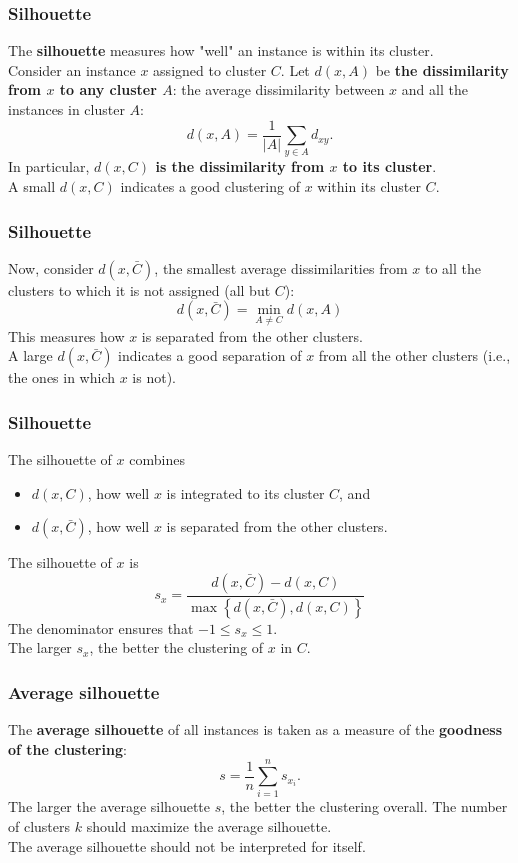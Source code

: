 \begin{frame}
\frametitle{Silhouette}
The {\bf silhouette} measures how "well" an instance is within its cluster. \\
\vspace{0.3cm}
Consider an instance $x$ assigned to cluster $C$. Let $d(x,A)$ be {\bf the dissimilarity from $x$ to any cluster $A$}: the average dissimilarity between $x$ and all the instances in cluster $A$:
$$
d(x,A) = \frac{1}{|A|} \sum_{y\in A} d_{xy}.
$$ 
In particular, {\bf $d(x, C)$ is the dissimilarity from $x$ to its cluster}.\\
\vspace{0.3cm}
A small $d(x,C)$ indicates a good clustering of $x$ within its cluster $C$.
\end{frame}
\begin{frame}
\frametitle{Silhouette}
Now, consider $d(x,\bar{C})$, the smallest average dissimilarities from $x$ to all the clusters to which it is not assigned (all but $C$):
$$
d(x,\bar{C}) = \min_{A\neq C} d(x, A) 
$$
This measures how $x$ is separated from the other clusters.\\
\vspace{0.3cm} 
A large $d(x,\bar{C})$ indicates a good separation of $x$ from all the other clusters (i.e., the ones in which $x$ is not).
\end{frame}
\begin{frame}
\frametitle{Silhouette}
The silhouette of $x$ combines 
\begin{itemize}
\item $d(x, C)$, how well $x$ is integrated to its cluster $C$, and 
\item $d(x,\bar{C})$, how well $x$ is separated from the other clusters.
\end{itemize}
The silhouette of $x$ is
$$
s_x=\frac{d(x,\bar{C})-d(x,C)}{\max\left\{d(x,\bar{C}),d(x,C)\right\}}
$$
The denominator ensures that $-1\leq s_x\leq 1$. \\
\vspace{0.3cm}
The larger $s_x$, the better the clustering of $x$ in $C$.
\end{frame}
\begin{frame}
\frametitle{Average silhouette}
The {\bf average silhouette} of all instances is taken as a measure of the {\bf goodness of the clustering}:
$$
s = \frac{1}{n}\sum_{i=1}^n s_{x_i}.
$$
The larger the average silhouette $s$, the better the clustering overall. The number of clusters $k$ should maximize the average silhouette.\\
\vspace{0.3cm}
The average silhouette should not be interpreted for itself. 
\end{frame}
